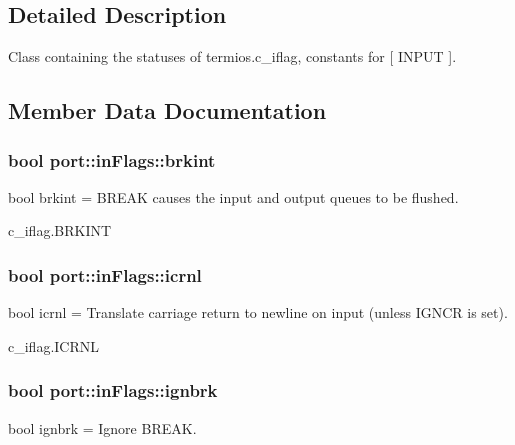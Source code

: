 \subsection{Detailed Description}
Class containing the statuses of termios.\+c\+\_\+iflag, constants for \mbox{[} I\+N\+P\+UT \mbox{]}. 

\subsection{Member Data Documentation}
\subsubsection[{\texorpdfstring{brkint}{brkint}}]{\setlength{\rightskip}{0pt plus 5cm}bool port\+::in\+Flags\+::brkint}\hypertarget{classport_1_1inFlags_a47a2644d51869bc062b68f9eff0f4833}{}\label{classport_1_1inFlags_a47a2644d51869bc062b68f9eff0f4833}


bool brkint = B\+R\+E\+AK causes the input and output queues to be flushed. 

c\+\_\+iflag.\+B\+R\+K\+I\+NT
\subsubsection[{\texorpdfstring{icrnl}{icrnl}}]{\setlength{\rightskip}{0pt plus 5cm}bool port\+::in\+Flags\+::icrnl}\hypertarget{classport_1_1inFlags_aa2d6f6ad81fcb7e8e9516f62289f605f}{}\label{classport_1_1inFlags_aa2d6f6ad81fcb7e8e9516f62289f605f}


bool icrnl = Translate carriage return to newline on input (unless I\+G\+N\+CR is set). 

c\+\_\+iflag.\+I\+C\+R\+NL
\subsubsection[{\texorpdfstring{ignbrk}{ignbrk}}]{\setlength{\rightskip}{0pt plus 5cm}bool port\+::in\+Flags\+::ignbrk}\hypertarget{classport_1_1inFlags_a2f5e99598ddb18261c996e873602b32a}{}\label{classport_1_1inFlags_a2f5e99598ddb18261c996e873602b32a}


bool ignbrk = Ignore B\+R\+E\+AK. 

